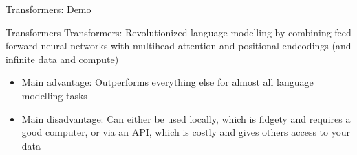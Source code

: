 \documentclass[10pt]{beamer}
\begin{document}
    \begin{frame}{Transformers: Demo}
        \centering
    \end{frame}
    \begin{frame}{Transformers}
        Transformers: Revolutionized language modelling by combining feed forward neural networks with multihead attention and positional endcodings (and infinite data and compute)
            \begin{itemize}
                \item Main advantage: Outperforms everything else for almost all language modelling tasks
                \item Main disadvantage: Can either be used locally, which is fidgety and requires a good computer, or via an API, which is costly and gives others access to your data
            \end{itemize}
    \end{frame}
\end{document}
